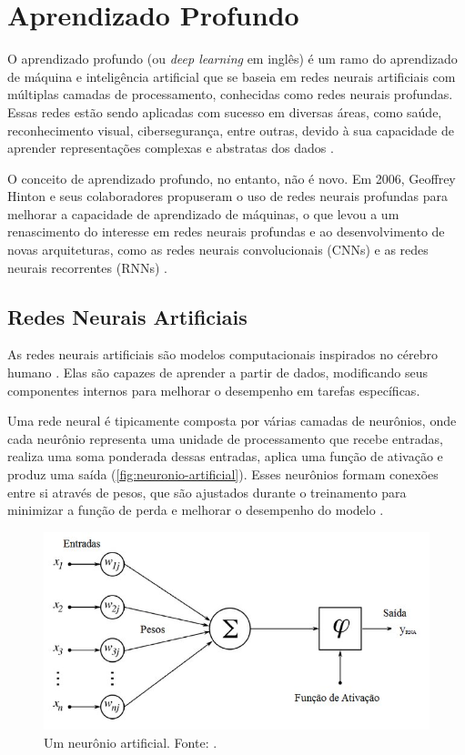 \section{Aprendizado Profundo}\label{sec:aprendizado-profundo}

O aprendizado profundo (ou \textit{deep learning} em inglês) é um ramo do aprendizado de máquina e inteligência artificial que se baseia em redes neurais artificiais com múltiplas camadas de processamento, conhecidas como redes neurais profundas. Essas redes estão sendo aplicadas com sucesso em diversas áreas, como saúde, reconhecimento visual, cibersegurança, entre outras, devido à sua capacidade de aprender representações complexas e abstratas dos dados \citep{Sarker2021}.

O conceito de aprendizado profundo, no entanto, não é novo. Em 2006, Geoffrey Hinton e seus colaboradores propuseram o uso de redes neurais profundas para melhorar a capacidade de aprendizado de máquinas, o que levou a um renascimento do interesse em redes neurais profundas e ao desenvolvimento de novas arquiteturas, como as redes neurais convolucionais (CNNs) e as redes neurais recorrentes (RNNs) \citep{Hinton2006}.

\subsection{Redes Neurais Artificiais}

As redes neurais artificiais são modelos computacionais inspirados no cérebro humano \citep{McCulloch1943}. Elas são capazes de aprender a partir de dados, modificando seus componentes internos para melhorar o desempenho em tarefas específicas.

Uma rede neural é tipicamente composta por várias camadas de neurônios, onde cada neurônio representa uma unidade de processamento que recebe entradas, realiza uma soma ponderada dessas entradas, aplica uma função de ativação e produz uma saída (\autoref{fig:neuronio-artificial}). Esses neurônios formam conexões entre si através de pesos, que são ajustados durante o treinamento para minimizar a função de perda e melhorar o desempenho do modelo \citep{Grossi2007}.

\begin{figure}
    \centering
    \includegraphics[width=0.5\linewidth]{figs/neuronio-artificial.jpg}
    \caption{Um neurônio artificial. Fonte: \cite{Martiniano2016}.}
    \label{fig:neuronio-artificial}
\end{figure}

